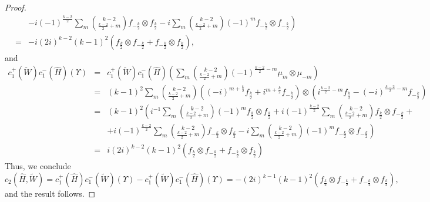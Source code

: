 \documentclass{amsart}
\theoremstyle{definition}
\theoremstyle{remark}
\numberwithin{equation}{section}
\begin{document}
\begin{proof}
\begin{eqnarray*}
    &&\left.-i(-1)^{\frac{k-2}{2}}\sum_{m}\binom{k-2}{\frac{k-2}{2}+m}f_{-\frac{k}{2}}\otimes f_{\frac{k}{2}}-i\sum_{m}\binom{k-2}{\frac{k-2}{2}+m}(-1)^{m}f_{-\frac{k}{2}}\otimes f_{-\frac{k}{2}}\right)\\
    &=&-i(2i)^{k-2}(k-1)^2\left(f_{\frac{k}{2}}\otimes f_{-\frac{k}{2}}+f_{-\frac{k}{2}}\otimes f_{\frac{k}{2}}\right),
\end{eqnarray*}
and
\begin{eqnarray*}
    c_1^+(\tilde W)c_1^-(\hat H)(\Upsilon)&=&c_1^+(\tilde W)c_1^-(\hat H)\left(\sum_{m}\binom{k-2}{\frac{k-2}{2}+m}(-1)^{\frac{k-2}{2}-m} \mu_m\otimes\mu_{-m}\right)\\
    &=&(k-1)^2\sum_{m}\binom{k-2}{\frac{k-2}{2}+m}\left((-i)^{m+\frac{k}{2}}f_{\frac{k}{2}}+ i^{m+\frac{k}{2}}f_{-\frac{k}{2}}\right)\otimes\left(i^{\frac{k-2}{2}-m}f_{\frac{k}{2}}- (-i)^{\frac{k-2}{2}-m}f_{-\frac{k}{2}}\right)\\
    &=&(k-1)^2\left(i^{-1}\sum_{m}\binom{k-2}{\frac{k-2}{2}+m}(-1)^{m}f_{\frac{k}{2}}\otimes f_{\frac{k}{2}}+i(-1)^{\frac{k-2}{2}}\sum_{m}\binom{k-2}{\frac{k-2}{2}+m}f_{\frac{k}{2}}\otimes f_{-\frac{k}{2}}+\right.\\
    &&\left.+i(-1)^{\frac{k-2}{2}}\sum_{m}\binom{k-2}{\frac{k-2}{2}+m}f_{-\frac{k}{2}}\otimes f_{\frac{k}{2}}-i\sum_{m}\binom{k-2}{\frac{k-2}{2}+m}(-1)^{m}f_{-\frac{k}{2}}\otimes f_{-\frac{k}{2}}\right)\\
    &=&i(2i)^{k-2}(k-1)^2\left(f_{\frac{k}{2}}\otimes f_{-\frac{k}{2}}+f_{-\frac{k}{2}}\otimes f_{\frac{k}{2}}\right)
\end{eqnarray*}
Thus, we conclude
\[
    c_2(\hat H,\tilde W)=c_1^+(\hat H)c_1^-(\tilde W)(\Upsilon)-c_1^+(\tilde W)c_1^-(\hat H)(\Upsilon)=-(2i)^{k-1}(k-1)^2\left(f_{\frac{k}{2}}\otimes f_{-\frac{k}{2}}+f_{-\frac{k}{2}}\otimes f_{\frac{k}{2}}\right),
\]
and the result follows.
\end{proof}
\end{document}
